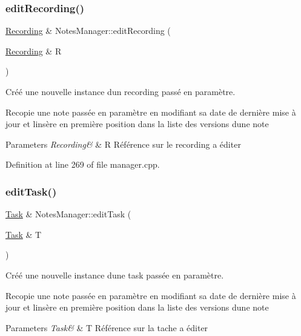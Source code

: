 \subsubsection{\texorpdfstring{edit\+Recording()}{editRecording()}}
{\footnotesize\ttfamily \hyperlink{class_recording}{Recording} \& Notes\+Manager\+::edit\+Recording (\begin{DoxyParamCaption}\item[{\hyperlink{class_recording}{Recording} \&}]{R }\end{DoxyParamCaption})}



Créé une nouvelle instance d\textquotesingle{}un recording passé en paramètre. 

Recopie une note passée en paramètre en modifiant sa date de dernière mise à jour et l\textquotesingle{}insère en première position dans la liste des versions d\textquotesingle{}une note 
\begin{DoxyParams}{Parameters}
{\em Recording\&} & R Référence sur le recording a éditer \\
\hline
\end{DoxyParams}


Definition at line 269 of file manager.\+cpp.

\mbox{\label{class_notes_manager_a8f8f2b6aaa8c7d41356f9e4be7da2da5}} 
\subsubsection{\texorpdfstring{edit\+Task()}{editTask()}}
{\footnotesize\ttfamily \hyperlink{class_task}{Task} \& Notes\+Manager\+::edit\+Task (\begin{DoxyParamCaption}\item[{\hyperlink{class_task}{Task} \&}]{T }\end{DoxyParamCaption})}



Créé une nouvelle instance d\textquotesingle{}une task passée en paramètre. 

Recopie une note passée en paramètre en modifiant sa date de dernière mise à jour et l\textquotesingle{}insère en première position dans la liste des versions d\textquotesingle{}une note 
\begin{DoxyParams}{Parameters}
{\em Task\&} & T Référence sur la tache a éditer \\
\hline
\end{DoxyParams}


